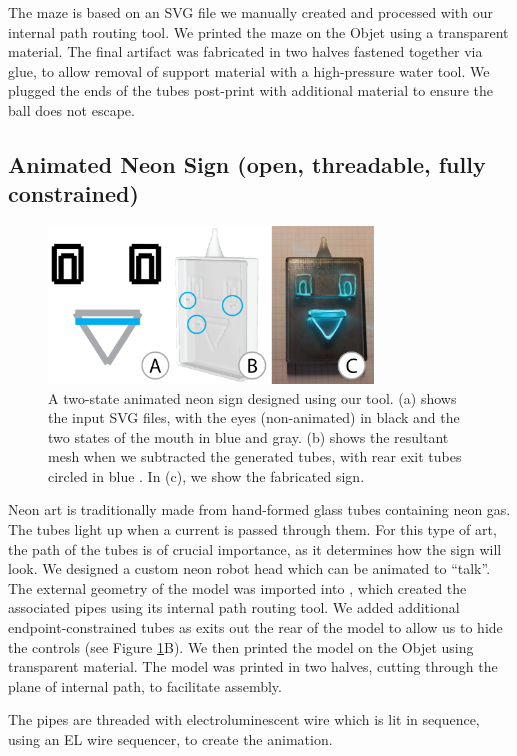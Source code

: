 The maze is based on an SVG file we manually created and processed with our internal path routing tool.  We printed the maze on the Objet using a transparent material. The final artifact was fabricated in two halves fastened together via glue, to allow removal of support material with a high-pressure water tool.  We plugged the ends of the tubes post-print with additional material to ensure the ball does not escape.

\subsection{Animated Neon Sign (open, threadable, fully constrained)}

\begin{figure}[t]
\centering
    \includegraphics[width=3.4in]{figures/sign.png}
\caption{A two-state animated neon sign designed using our tool.  (a) shows the input SVG files, with the eyes (non-animated) in black and the two states of the mouth in {\color{blue}blue} and {\color{gray}gray}.  (b) shows the resultant mesh when we subtracted the generated tubes, with rear exit tubes circled in {\color{blue}blue} . In (c), we show the fabricated sign.}
\label{fig:neon}
\end{figure}

Neon art is traditionally made from hand-formed glass tubes containing neon gas.  The tubes light up when a current is passed through them.  For this type of art, the path of the tubes is of crucial importance, as it determines how the sign will look.  We designed a custom neon robot head which can be animated to ``talk''. 
The external geometry of the model was imported into \systemnamenospace, which created the associated pipes using its internal path routing tool.  We added additional endpoint-constrained tubes as exits out the rear of the model to allow us to hide the controls (see Figure \ref{fig:neon}B).  We then printed the model on the Objet using transparent material. The model was printed in two halves, cutting through the plane of internal path, to facilitate assembly. 

The pipes are threaded with electroluminescent wire which is lit in sequence, using an EL wire sequencer, to create the animation.